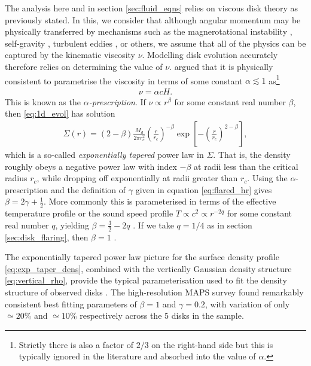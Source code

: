 The analysis here and in section \ref{sec:fluid_eqns} relies on viscous disk theory as previously stated.
In this, we consider that although angular momentum may be physically transferred by mechanisms such as the magnerotational instability \citep{sano2000}, self-gravity \citep{kratter2016}, turbulent eddies \citep{klahr2003}, or others, we assume that all of the physics can be captured by the kinematic viscosity $\nu$.
Modelling disk evolution accurately therefore relies on determining the value of $\nu$.
\citet{shakura1973} argued that it is physically consistent to parametrise the viscosity in terms of some constant $\alpha \lesssim 1$ as\footnote[2]{Strictly there is also a factor of $2/3$ on the right-hand side but this is typically ignored in the literature and absorbed into the value of $\alpha$.}
\begin{align}
    \nu = \alpha c H.
\end{align}
This is known as the $\alpha$\textit{-prescription}. If $\nu \propto r^\beta$ for some constant real number $\beta$, then \ref{eq:1d_evol} has solution \citep{lynden-bell1974}
\begin{align}
    \Sigma(r) = (2 - \beta) \frac{M_d}{2 \pi r_c^2} \left( \frac{r}{r_c} \right)^{-\beta} \exp{\left[ - \left(\frac{r}{r_c}\right)^{2-\beta} \right]}, \label{eq:exp_taper_dens}
\end{align}
which is a so-called \textit{exponentially tapered} power law in $\Sigma$.
That is, the density roughly obeys a negative power law with index $-\beta$ at radii less than the critical radius $r_c$, while dropping off exponentially at radii greater than $r_c$.
Using the $\alpha$-prescription and the definition of $\gamma$ given in equation \ref{eq:flared_hr} gives $\beta=2\gamma+\frac{1}{2}$.
More commonly this is parameterised in terms of the effective temperature profile or the sound speed profile $T \propto c^2 \propto r^{-2q}$ for some constant real number $q$, yielding $\beta = \frac{3}{2} - 2q$ \citep{hartmann1998}.
If we take $q=1/4$ as in section \ref{sec:disk_flaring}, then $\beta=1$ \citep{chiang1997}.

The exponentially tapered power law picture for the surface density profile \ref{eq:exp_taper_dens}, combined with the vertically Gaussian density structure \ref{eq:vertical_rho}, provide the typical parameterisation used to fit the density structure of observed disks \citep{andrews2011,zhang2021}.
The high-resolution MAPS survey found remarkably consistent best fitting parameters of $\beta=1$ and $\gamma=0.2$, with variation of only $\simeq20$\% and $\simeq10$\% respectively across the 5 disks in the sample.


